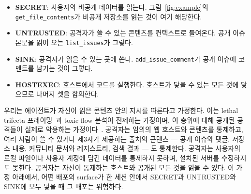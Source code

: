 \documentclass[acmsmall,screen,review,anonymous]{acmart}
\begin{document}
\begin{itemize}
    \item \textbf{SECRET}: 사용자의 비공개 데이터를 읽는다. 그림~\ref{fig:example}의 \texttt{get\_file\_contents}가 비공개 저장소를 읽는 것이 여기 해당한다.
    \item \textbf{UNTRUSTED}: 공격자가 쓸 수 있는 콘텐츠를 컨텍스트로 들여온다. 공개 이슈 본문을 읽어 오는 \texttt{list\_issues}가 그렇다.
    \item \textbf{SINK}: 공격자가 읽을 수 있는 곳에 쓴다. \texttt{add\_issue\_comment}가 공개 이슈에 코멘트를 남기는 것이 그렇다.
    \item \textbf{HOSTEXEC}: 호스트에서 코드를 실행한다. 호스트가 닿을 수 있는 모든 것에 닿으므로 나머지 셋을 함의한다.
\end{itemize}

우리는 에이전트가 자신이 읽은 콘텐츠 안의 지시를 따른다고 가정한다. 이는 lethal trifecta 프레이밍~\cite{willison2025lethal}과 toxic-flow 분석이 전제하는 가정이며, 이 층위에 대해 공개된 공격들이 실제로 악용하는 가정이다~\cite{zhao2026parasites, zeng2026colluskill, liu2026sharelock}. 공격자는 임의의 웹 호스트와 콘텐츠를 통제하고, 여러 사람이 쓸 수 있거나 제3자가 제공하는 출처의 콘텐츠 --- 공개 이슈와 댓글, 저장소 내용, 커뮤니티 문서와 레지스트리, 검색 결과 --- 도 통제한다. 공격자는 사용자의 로컬 파일이나 사용자 계정에 담긴 데이터를 통제하지 못하며, 설치된 서버를 수정하지도 못한다. 공격자는 자신이 통제하는 호스트와 공개된 모든 것을 읽을 수 있다. 이 가정 아래에서, 어떤 배포의 surface가 한 세션 안에서 SECRET과 UNTRUSTED와 SINK에 모두 닿을 때 그 배포는 위험하다.
\end{document}
